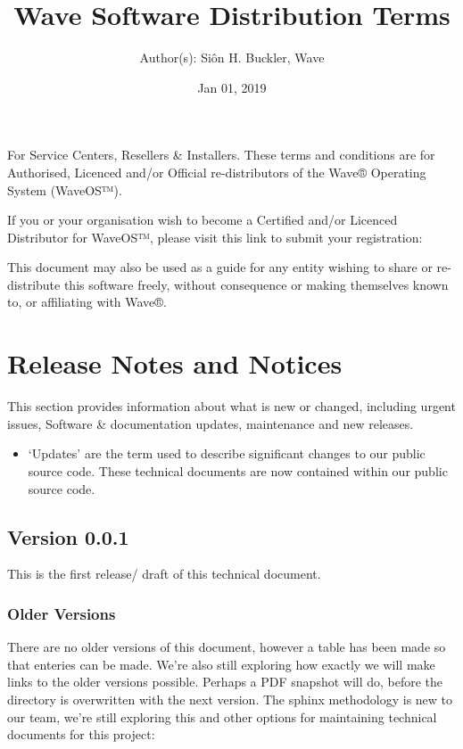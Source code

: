\documentclass[letterpaper,10pt,english]{sphinxmanual}
\title{Wave Software Distribution Terms}
\date{Jan 01, 2019}
\author{Author(s): Siôn H. Buckler, Wave}
\begin{document}
\maketitle
\sphinxtableofcontents
{}\label{\detokenize{index::doc}}


For Service Centers, Resellers \& Installers. These terms and conditions are for Authorised, Licenced and/or Official re-distributors of the Wave® Operating System (WaveOS™).

If you or your organisation wish to become a Certified and/or Licenced Distributor for WaveOS™, please visit this link to submit your registration:  

This document may also be used as a guide for any entity wishing to share or re-distribute this software freely, without consequence or making themselves known to, or affiliating with Wave®.


\chapter{Release Notes and Notices}
\label{\detokenize{releasenotes:release-notes-and-notices}}\label{\detokenize{releasenotes::doc}}
This section provides information about what is new or changed, including urgent issues, Software \& documentation updates, maintenance and new releases.
\begin{itemize}
\item {} 
‘Updates’ are the term used to describe significant changes to our public source code. These technical documents are now contained within our public source code.

\end{itemize}


\section{Version 0.0.1}
\label{\detokenize{releasenotes:version-0-0-1}}
This is the first release/ draft of this technical document.


\subsection{Older Versions}
\label{\detokenize{releasenotes:older-versions}}
There are no older versions of this document, however a table has been made so that enteries can be made. We’re also still exploring how exactly we will make links to the older versions possible. Perhaps a PDF snapshot will do, before the directory is overwritten with the next version. The sphinx methodology is new to our team, we’re still exploring this and other options for maintaining technical documents for this project:
\end{document}
